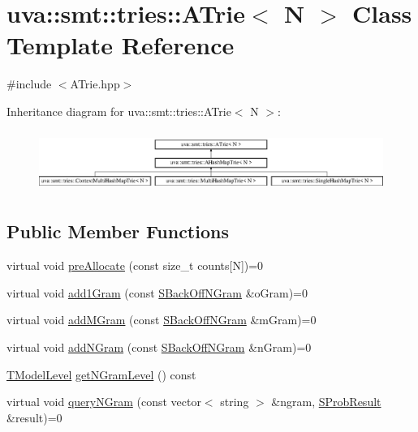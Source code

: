 \hypertarget{classuva_1_1smt_1_1tries_1_1_a_trie}{}\section{uva\+:\+:smt\+:\+:tries\+:\+:A\+Trie$<$ N $>$ Class Template Reference}
\label{classuva_1_1smt_1_1tries_1_1_a_trie}


{\ttfamily \#include $<$A\+Trie.\+hpp$>$}

Inheritance diagram for uva\+:\+:smt\+:\+:tries\+:\+:A\+Trie$<$ N $>$\+:\begin{figure}[H]
\begin{center}
\leavevmode
\includegraphics[height=2.007169cm]{classuva_1_1smt_1_1tries_1_1_a_trie}
\end{center}
\end{figure}
\subsection*{Public Member Functions}
\begin{DoxyCompactItemize}
\item 
virtual void \hyperlink{classuva_1_1smt_1_1tries_1_1_a_trie_a642f48565e195a41a768b2cfa247735a}{pre\+Allocate} (const size\+\_\+t counts\mbox{[}N\mbox{]})=0
\item 
virtual void \hyperlink{classuva_1_1smt_1_1tries_1_1_a_trie_af184dbb0b095d24c76f79c7da6479eda}{add1\+Gram} (const \hyperlink{structuva_1_1smt_1_1tries_1_1_s_back_off_n_gram}{S\+Back\+Off\+N\+Gram} \&o\+Gram)=0
\item 
virtual void \hyperlink{classuva_1_1smt_1_1tries_1_1_a_trie_acf62fc322ece5ec01ca00e96e17eb9ef}{add\+M\+Gram} (const \hyperlink{structuva_1_1smt_1_1tries_1_1_s_back_off_n_gram}{S\+Back\+Off\+N\+Gram} \&m\+Gram)=0
\item 
virtual void \hyperlink{classuva_1_1smt_1_1tries_1_1_a_trie_a240c090a5651e74304cf37b131ca9741}{add\+N\+Gram} (const \hyperlink{structuva_1_1smt_1_1tries_1_1_s_back_off_n_gram}{S\+Back\+Off\+N\+Gram} \&n\+Gram)=0
\item 
\hyperlink{namespaceuva_1_1smt_1_1tries_a26064146e98856c7c4185efab0e61a36}{T\+Model\+Level} \hyperlink{classuva_1_1smt_1_1tries_1_1_a_trie_a3b2fa839686009a777f4ffbd12f1284f}{get\+N\+Gram\+Level} () const 
\item 
virtual void \hyperlink{classuva_1_1smt_1_1tries_1_1_a_trie_a86f8301bb7a9e7a232f16bcd000062b2}{query\+N\+Gram} (const vector$<$ string $>$ \&ngram, \hyperlink{structuva_1_1smt_1_1tries_1_1_s_prob_result}{S\+Prob\+Result} \&result)=0
\end{DoxyCompactItemize}


